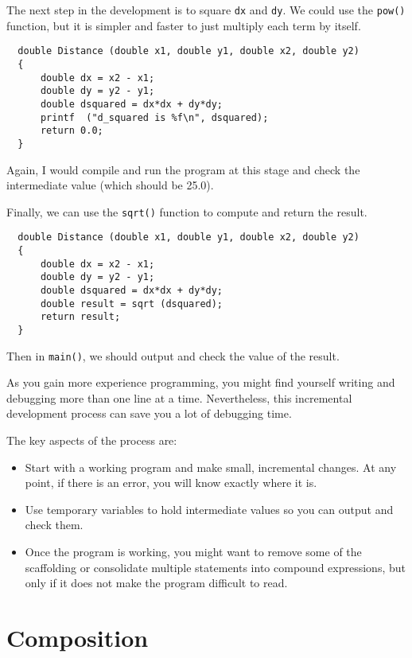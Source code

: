 The next step in the development is to square {\tt dx} and {\tt dy}.
We could use the {\tt pow()} function, but it is simpler and
faster to just multiply each term by itself.

\begin{verbatim}
  double Distance (double x1, double y1, double x2, double y2)
  {
      double dx = x2 - x1;
      double dy = y2 - y1;
      double dsquared = dx*dx + dy*dy;
      printf  ("d_squared is %f\n", dsquared);
      return 0.0;
  }
\end{verbatim}
%
Again, I would compile and run the program at this stage
and check the intermediate value (which should be 25.0).

Finally, we can use the {\tt sqrt()} function to compute and
return the result.

\begin{verbatim}
  double Distance (double x1, double y1, double x2, double y2) 
  {
      double dx = x2 - x1;
      double dy = y2 - y1;
      double dsquared = dx*dx + dy*dy;
      double result = sqrt (dsquared);
      return result;
  }
\end{verbatim}
%
Then in {\tt main()}, we should output and check the value of the result.

As you gain more experience programming, you might find yourself
writing and debugging more than one line at a time.  Nevertheless,
this incremental development process can save you a lot of
debugging time.

The key aspects of the process are:

\begin{itemize}

\item Start with a working program and make small, incremental
changes.  At any point, if there is an error, you will know
exactly where it is.

\item Use temporary variables to hold intermediate values so
you can output and check them.

\item Once the program is working, you might want to remove
some of the scaffolding or consolidate multiple statements into
compound expressions, but only if it does not make the program
difficult to read.

\end{itemize}

\section{Composition}

